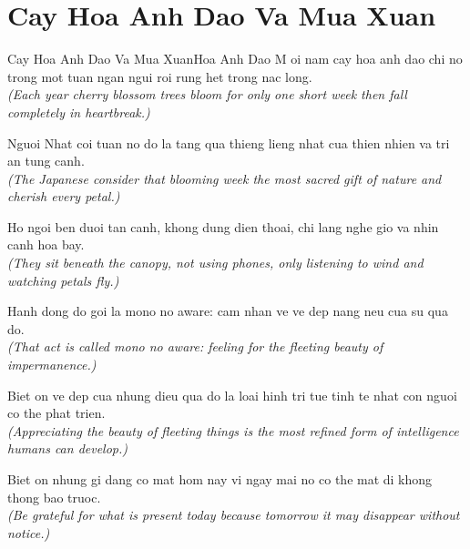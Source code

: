 \section{Cay Hoa Anh Dao Va Mua Xuan}
\begin{truyen}{Cay Hoa Anh Dao Va Mua Xuan}{Hoa Anh Dao}
M oi nam cay hoa anh dao chi no trong mot tuan ngan ngui roi rung het trong nac long.\\
\textit{(Each year cherry blossom trees bloom for only one short week then fall completely in heartbreak.)}

Nguoi Nhat coi tuan no do la tang qua thieng lieng nhat cua thien nhien va tri an tung canh.\\
\textit{(The Japanese consider that blooming week the most sacred gift of nature and cherish every petal.)}

Ho ngoi ben duoi tan canh, khong dung dien thoai, chi lang nghe gio va nhin canh hoa bay.\\
\textit{(They sit beneath the canopy, not using phones, only listening to wind and watching petals fly.)}

Hanh dong do goi la mono no aware: cam nhan ve ve dep nang neu cua su qua do.\\
\textit{(That act is called mono no aware: feeling for the fleeting beauty of impermanence.)}

Biet on ve dep cua nhung dieu qua do la loai hinh tri tue tinh te nhat con nguoi co the phat trien.\\
\textit{(Appreciating the beauty of fleeting things is the most refined form of intelligence humans can develop.)}

\end{truyen}
\begin{baihoc}
  Biet on nhung gi dang co mat hom nay vi ngay mai no co the mat di khong thong bao truoc.\\
  \textit{(Be grateful for what is present today because tomorrow it may disappear without notice.)}
\end{baihoc}

